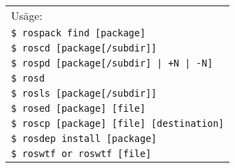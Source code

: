 \documentclass[10pt,landscape]{article}
\begin{document}
\begin{multicols}{3}
\begin{tabular}{l}
Us\=age:\\
\hspace{3ex} \texttt{\$ rospack find [package]}\\
\hspace{3ex} \texttt{\$ roscd [package[/subdir]]}\\
\hspace{3ex} \texttt{\$ rospd [package[/subdir] | +N | -N]}\\
\hspace{3ex} \texttt{\$ rosd}\\
\hspace{3ex} \texttt{\$ rosls [package[/subdir]]}\\
\hspace{3ex} \texttt{\$ rosed [package] [file]}\\
\hspace{3ex} \texttt{\$ roscp [package] [file] [destination]}\\
\hspace{3ex} \texttt{\$ rosdep install [package]}\\
\hspace{3ex} \texttt{\$ roswtf or roswtf [file]}\\
\end{tabular}

\vfill

\end{multicols}
 
\end{document}
